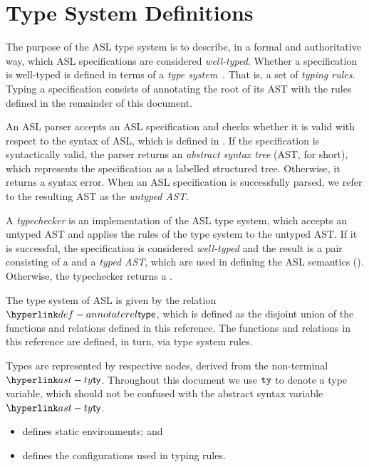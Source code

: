 \chapter{Type System Definitions\label{chap:TypeChecking}}

The purpose of the ASL type system is to describe, in a formal and authoritative way,
which ASL specifications are considered \emph{well-typed}.
Whether a specification is well-typed is defined in terms of a \emph{type system}~\cite{TypeSystemsLucaCardelli}.
That is, a set of \emph{typing rules}.
Typing a specification consists of annotating the root of its AST with the rules defined
in the remainder of this document.

An ASL parser accepts an ASL specification and checks whether it is valid with respect to the syntax of ASL,
which is defined in .
If the specification is syntactically valid, the parser returns an \emph{abstract syntax tree} (AST, for short),
which represents the specification as a labelled structured tree. Otherwise, it returns a syntax error.
When an ASL specification is successfully parsed, we refer to the resulting AST as the \emph{untyped AST}.

A \emph{typechecker} is an implementation of the ASL type system, which accepts an untyped AST and applies the
rules of the type system to the untyped AST. If it is successful, the specification
is considered \emph{well-typed} and the result is a pair consisting of
a \emph{\staticenvironmentterm{}} and a \emph{typed AST},
which are used in defining the ASL semantics ().
Otherwise, the typechecker returns a \typingerrorterm{}.

\hypertarget{def-annotaterel}{}
The type system of ASL is given by the relation $\annotaterel$, which is defined as the disjoint union
of the functions and relations defined in this reference.
The functions and relations in this reference are defined, in turn, via type system rules.

Types are represented by respective \typedast{} nodes, derived from the non-terminal $\ty$.
Throughout this document we use $\texttt{ty}$ to denote a type variable, which should not be confused with the abstract syntax variable $\ty$.

\ChapterOutline
\begin{itemize}
  \item {} defines static environments; and
  \item {} defines the configurations used in typing rules.
\end{itemize}

